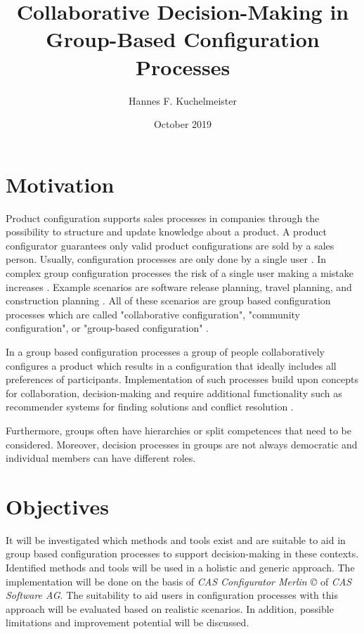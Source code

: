 \documentclass{article}
\title{Collaborative Decision-Making in Group-Based Configuration Processes}
\author{Hannes F. Kuchelmeister}
\date{October 2019}
\begin{document}
\maketitle

\section{Motivation}

Product configuration supports sales processes in companies through the possibility to structure and update knowledge about a product. A product configurator guarantees only valid product configurations are sold by a sales person. Usually, configuration processes are only done by a single user \cite{felferningGroupBasedConfiguration2016, velasquez-guevaraMultiSPLOTSupportingMultiuser2018a}.
In complex group configuration processes the risk of a single user making a mistake increases \cite{felfernigGroupDecisionSupport2011}.
Example scenarios are software release planning, travel planning, and construction planning \cite{felfernigOpenConfiguration2014}. 
All of these scenarios are group based configuration processes which are called "collaborative configuration", "community configuration", or "group-based configuration" \cite{felferningGroupBasedConfiguration2016, felfernigOpenConfiguration2014,mendoncaCollaborativeProductConfiguration2008,felfernigKnowledgebasedConfigurationResearch2014}.

In a group based configuration processes a group of people collaboratively configures a product which results in a configuration that ideally includes all preferences of participants. Implementation of such processes build upon concepts for collaboration, decision-making and require additional functionality such as recommender systems for finding solutions and conflict resolution \cite{felfernigKnowledgebasedConfigurationResearch2014}.


Furthermore, groups often have hierarchies or split competences that need to be considered. Moreover, decision processes in groups are not always democratic and individual members can have different roles.

\section{Objectives}

It will be investigated which methods and tools exist and are suitable to aid in group based configuration processes to support decision-making in these contexts. Identified methods and tools will be used in a holistic and generic approach. 
The implementation will be done on the basis of \emph{CAS Configurator Merlin \copyright} of \emph{CAS Software AG}. The suitability to aid users in configuration processes with this approach will be evaluated based on realistic scenarios. In addition, possible limitations and improvement potential will be discussed.
\end{document}
